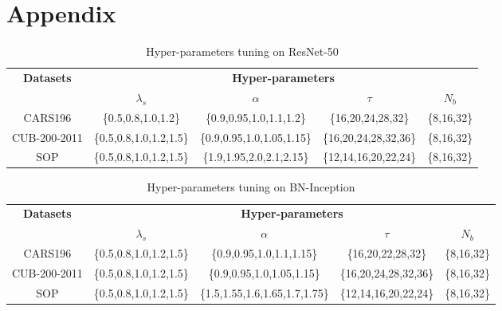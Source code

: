 \newpage

\section{Appendix}

\begin{table}[ht!]
\centering
\setlength{\tabcolsep}{0.25mm}
\begin{tabular}{ccccc}
\toprule[0.8pt]
\multirow{2}{*}{\textbf{Datasets}} & \multicolumn{4}{c}{\textbf{Hyper-parameters}}                                                       \\ \cline{2-5} 
                          & $\lambda_s$               & $\alpha$                      & $\tau$                   & $N_b$  \\ \hline \hline
CARS196                   & \{0.5,0.8,1.0,1.2\}     & \{0.9,0.95,1.0,1.1,1.2\}   & \{16,20,24,28,32\}    & \{8,16,32\} \\
CUB-200-2011              & \{0.5,0.8,1.0,1.2,1.5\} & \{0.9,0.95,1.0,1.05,1.15\} & \{16,20,24,28,32,36\} & \{8,16,32\} \\
SOP                       & \{0.5,0.8,1.0,1.2,1.5\} & \{1.9,1.95,2.0,2.1,2.15\}  & \{12,14,16,20,22,24\} & \{8,16,32\} \\ 
\bottomrule[0.8pt]
\end{tabular}
\caption{Hyper-parameters tuning on ResNet-50}
\label{Hyperparameters_ResNet50}
\end{table}

\begin{table}[ht!]
\centering
\setlength{\tabcolsep}{0.25mm}
\begin{tabular}{ccccc}
\toprule[0.8pt]
\multirow{2}{*}{\textbf{Datasets}} & \multicolumn{4}{c}{\textbf{Hyper-parameters}}                                                       \\ \cline{2-5} 
                          & $\lambda_s$               & $\alpha$                      & $\tau$                   & $N_b$  \\ \hline \hline
CARS196                   & \{0.5,0.8,1.0,1.2,1.5\} & \{0.9,0.95,1.0,1.1,1.15\}      & \{16,20,22,28,32\}    & \{8,16,32\} \\
CUB-200-2011              & \{0.5,0.8,1.0,1.2,1.5\} & \{0.9,0.95,1.0,1.05,1.15\}     & \{16,20,24,28,32,36\} & \{8,16,32\} \\
SOP                       & \{0.5,0.8,1.0,1.2,1.5\} & \{1.5,1.55,1.6,1.65,1.7,1.75\} & \{12,14,16,20,22,24\} & \{8,16,32\} \\ 
\bottomrule[0.8pt]
\end{tabular}
\caption{Hyper-parameters tuning on BN-Inception}
\label{Hyperparameters_BN}
\end{table}

